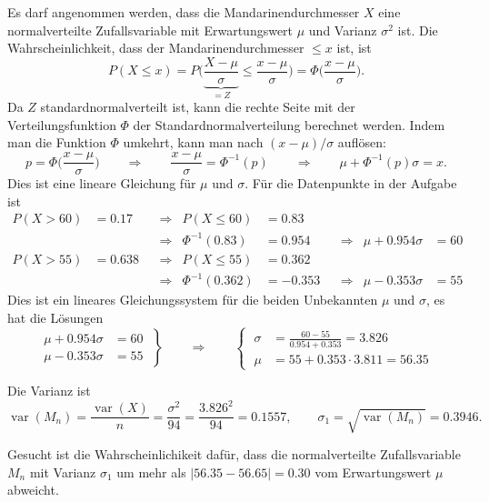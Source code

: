 \begin{loesung}
\begin{teilaufgaben}
\item
Es darf angenommen werden, dass die Mandarinendurchmesser $X$ eine
normalverteilte Zufallsvariable mit Erwartungswert $\mu$
und Varianz $\sigma^2$ ist.
Die Wahrscheinlichkeit, dass der Mandarinendurchmesser $\le x$ ist,
ist
\[
P(X\le x)
=
P\biggl(
\underbrace{\frac{X-\mu}{\sigma}}_{\displaystyle=Z}
\le
\frac{x-\mu}{\sigma}
\biggr)
=
\Phi\biggl(
\frac{x-\mu}{\sigma}
\biggr).
\]
Da $Z$ standardnormalverteilt ist, kann die rechte Seite mit der
Verteilungsfunktion $\Phi$ der Standardnormalverteilung berechnet werden.
Indem man die Funktion $\Phi$ umkehrt, kann man nach $(x-\mu)/\sigma$
auflösen:
\[
p
=
\Phi\biggl(\frac{x-\mu}{\sigma}\biggr)
\qquad\Rightarrow\qquad
\frac{x-\mu}{\sigma}
=
\Phi^{-1}(p)
\qquad\Rightarrow\qquad
\mu + \Phi^{-1}(p)\sigma = x.
\]
Dies ist eine lineare Gleichung für $\mu$ und $\sigma$.
Für die Datenpunkte in der Aufgabe ist
\begin{align*}
P(X > 60) &= 0.17  &&\Rightarrow& P(X\le 60) &= 0.83 \\
          &        &&\Rightarrow& \Phi^{-1}(0.83) &= 0.954
&&\Rightarrow& \mu+0.954 \sigma &= 60\\[4pt]
P(X > 55) &= 0.638 &&\Rightarrow& P(X\le 55) &= 0.362 \\
          &        &&\Rightarrow& \Phi^{-1}(0.362) &= -0.353
&&\Rightarrow& \mu-0.353 \sigma &= 55
\end{align*}
Dies ist ein lineares Gleichungssystem für die beiden Unbekannten $\mu$
und $\sigma$, es hat die Lösungen
\[
\left.\begin{aligned}
\mu+0.954 \sigma &= 60\\
\mu-0.353 \sigma &= 55
\end{aligned}\;\right\}
\qquad\Rightarrow\qquad
\left\{\;\begin{aligned}
\sigma&= \frac{60-55}{0.954+0.353} = 3.826\\
\mu   &= 55+0.353\cdot 3.811 = 56.35
\end{aligned}\right.
\]
\item
Die Varianz ist
\[
\operatorname{var}(M_n)
=
\frac{\operatorname{var}(X)}{n}
=
\frac{\sigma^2}{94}
=
\frac{3.826^2}{94}
=
0.1557,
\qquad
\sigma_1
=
\sqrt{\operatorname{var}(M_n)} = 0.3946.
\]
\item
Gesucht ist die Wahrscheinlichikeit dafür, dass die normalverteilte 
Zufallsvariable $M_n$ mit Varianz $\sigma_1$ um mehr als
$|56.35-56.65|=0.30$ vom Erwartungswert $\mu$ abweicht.

\end{teilaufgaben}
\end{loesung}

